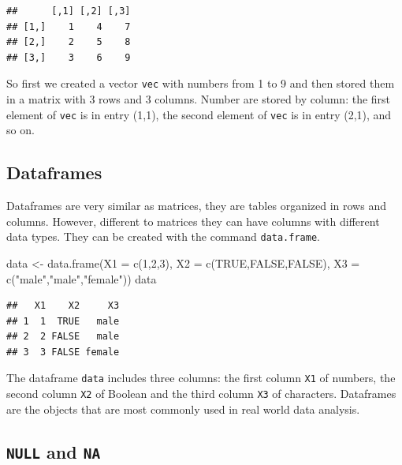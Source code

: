 \documentclass[
]{book}
\newenvironment{Shaded}{\begin{snugshade}}{\end{snugshade}}
\newcommand{\AttributeTok}[1]{\textcolor[rgb]{0.77,0.63,0.00}{#1}}
\newcommand{\ConstantTok}[1]{\textcolor[rgb]{0.00,0.00,0.00}{#1}}
\newcommand{\DecValTok}[1]{\textcolor[rgb]{0.00,0.00,0.81}{#1}}
\newcommand{\FunctionTok}[1]{\textcolor[rgb]{0.00,0.00,0.00}{#1}}
\newcommand{\NormalTok}[1]{#1}
\newcommand{\OtherTok}[1]{\textcolor[rgb]{0.56,0.35,0.01}{#1}}
\newcommand{\StringTok}[1]{\textcolor[rgb]{0.31,0.60,0.02}{#1}}
\begin{document}
\begin{verbatim}
##      [,1] [,2] [,3]
## [1,]    1    4    7
## [2,]    2    5    8
## [3,]    3    6    9
\end{verbatim}

So first we created a vector \texttt{vec} with numbers from 1 to 9 and then stored them in a matrix with 3 rows and 3 columns. Number are stored by column: the first element of \texttt{vec} is in entry (1,1), the second element of \texttt{vec} is in entry (2,1), and so on.

\hypertarget{dataframes}{%
\subsection{Dataframes}\label{dataframes}}

Dataframes are very similar as matrices, they are tables organized in rows and columns. However, different to matrices they can have columns with different data types. They can be created with the command \texttt{data.frame}.

\begin{Shaded}
\begin{Highlighting}[]
\NormalTok{data }\OtherTok{\textless{}{-}} \FunctionTok{data.frame}\NormalTok{(}\AttributeTok{X1 =} \FunctionTok{c}\NormalTok{(}\DecValTok{1}\NormalTok{,}\DecValTok{2}\NormalTok{,}\DecValTok{3}\NormalTok{), }\AttributeTok{X2 =} \FunctionTok{c}\NormalTok{(}\ConstantTok{TRUE}\NormalTok{,}\ConstantTok{FALSE}\NormalTok{,}\ConstantTok{FALSE}\NormalTok{),}
                   \AttributeTok{X3 =} \FunctionTok{c}\NormalTok{(}\StringTok{"male"}\NormalTok{,}\StringTok{"male"}\NormalTok{,}\StringTok{"female"}\NormalTok{))}
\NormalTok{data}
\end{Highlighting}
\end{Shaded}

\begin{verbatim}
##   X1    X2     X3
## 1  1  TRUE   male
## 2  2 FALSE   male
## 3  3 FALSE female
\end{verbatim}

The dataframe \texttt{data} includes three columns: the first column \texttt{X1} of numbers, the second column \texttt{X2} of Boolean and the third column \texttt{X3} of characters. Dataframes are the objects that are most commonly used in real world data analysis.

\hypertarget{null-and-na}{%
\subsection{\texorpdfstring{\texttt{NULL} and \texttt{NA}}{NULL and NA}}\label{null-and-na}}
\end{document}
